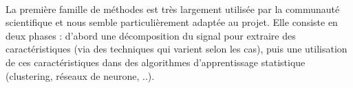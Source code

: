 \paragraph{}
\paragraph{}
\begin{table}[h!]
\caption{Familles de méthodes identifiées}
\label{tab:Methods}
\end{table}


\paragraph{}
La première famille de méthodes est très largement utilisée par la communauté scientifique et nous semble particulièrement adaptée au projet. Elle consiste en deux phases : d'abord une décomposition du signal pour extraire des caractéristiques (via des techniques qui varient selon les cas), puis une utilisation de ces caractéristiques dans des algorithmes d'apprentissage statistique (clustering, réseaux de neurone, ..). %
